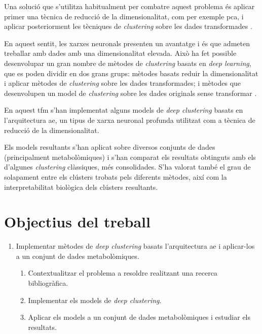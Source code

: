 \documentclass[CAT,BIB]{TFUOC}%
\begin{document}
        Una solució que s'utilitza habitualment
        per combatre aquest problema
        és aplicar primer una tècnica de reducció de la dimensionalitat,
        com per exemple \gls{pca},
        i aplicar posteriorment les tècniques de \textit{clustering}
        sobre les dades transformades \citep{Min2018, Masood2015}.

        En aquest sentit,
        les xarxes neuronals presenten un avantatge
        i és que admeten treballar amb dades amb una dimensionalitat elevada.
        Això ha fet possible desenvolupar
        un gran nombre de mètodes de \textit{clustering}
        basats en \textit{deep learning},
        que es poden dividir en dos grans grups:
        mètodes basats reduir la dimensionalitat
        i aplicar mètodes de \textit{clustering} sobre les dades transformades;
        i mètodes que desenvolupen un model de \textit{clustering}
        sobre les dades originals sense transformar \citep{Karim2021}.

        En aquest \gls{tfm}
        s'han implementat alguns models de \textit{deep clustering}
        basats en l'arquitectura \gls{ae},
        un tipus de xarxa neuronal profunda
        utilitzat com a tècnica de reducció de la dimensionalitat.

        Els models resultants s'han aplicat sobre diversos conjunts de dades
        (principalment metabolòmiques)
        i s'han comparat els resultats obtinguts
        amb els d'algunes \textit{clustering} clàssiques,
        més consolidades.
        S'ha valorat també el grau de solapament entre els clústers trobats pels diferents mètodes,
        així com la interpretabilitat biològica dels clústers resultants.

    \section{Objectius del treball}
    \label{s:objectius}

        \begin{enumerate}
            \item Implementar mètodes de \textit{deep clustering} basats l'arquitectura \gls{ae} i aplicar-los a un conjunt de dades metabolòmiques.
            \begin{enumerate}
                \item Contextualitzar el problema a resoldre realitzant una recerca bibliogràfica.
                \item Implementar els models de \textit{deep clustering}.
                \item Aplicar els models a un conjunt de dades metabolòmiques i estudiar els resultats.
            \end{enumerate}
        \end{enumerate}
\end{document}
